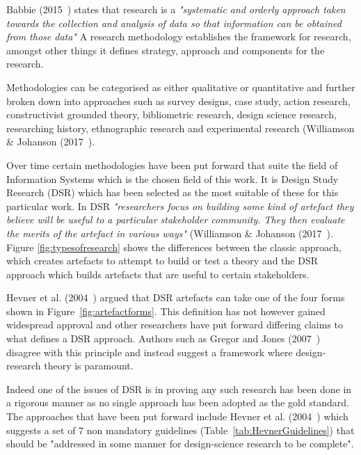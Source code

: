 \noindent

Babbie (2015~\cite{babbie2015practice}) states that research is a \textit{"systematic and orderly approach taken towards the collection and analysis of data so that information can be obtained from those data"}
A research methodology establishes the framework for research, amongst other things it defines strategy, approach and components for the research.

Methodologies can be categorised as either qualitative or quantitative and further broken down into approaches such as survey designs, case study, action research, constructivist grounded theory, bibliometric research, design science research, researching history, ethnographic research and experimental research (Williamson \& Johanson (2017~\cite{williamson2017research}).

Over time certain methodologies have been put forward that suite the field of Information Systems which is the chosen field of this work. It is Design Study Research (DSR) which has been selected as the most suitable of these for this particular work. In DSR \textit{"researchers focus on building some kind of artefact they believe will be useful to a particular stakeholder community. They then evaluate the merits of the artefact in various ways"} (Williamson \& Johanson (2017~\cite{williamson2017research}). Figure \ref{fig:typesofresearch} shows the differences between the classic approach, which creates artefacts to attempt to build or test a theory and the DSR approach which builds artefacts that are useful to certain stakeholders.



Hevner et al. (2004~\cite{hevner2004design}) argued that DSR artefacts can take one of the four forms shown in Figure~\ref{fig:artefactforms}. This definition has not however gained widespread approval and other researchers have put forward differing claims to what defines a DSR approach. Authors such as Gregor and Jones (2007~\cite{gregor2007anatomy}) disagree with this principle and instead suggest a framework where design-research theory is paramount.



Indeed one of the issues of DSR is in proving any such research has been done in a rigorous manner as no single approach has been adopted as the gold standard. The approaches that have been put forward include Hevner et al. (2004~\cite{hevner2004design}) which suggests a set of 7 non mandatory guidelines (Table~\ref{tab:HevnerGuidelines}) that should be "addressed in some manner for design-science research to be complete".

